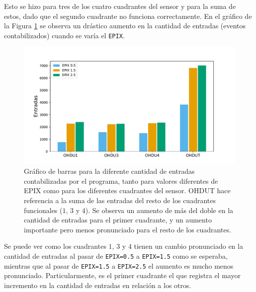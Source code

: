 Esto se hizo para tres de los cuatro cuadrantes del sensor y para la suma de estos, dado que el segundo cuadrante no funciona correctamente. En el gráfico de la Figura \ref{fig:EntradasVsEpix} se observa un drástico aumento en la cantidad de entradas (eventos contabilizados) cuando se varía el \verb|EPIX|.
\begin{figure}[h]
    \centering
    \includegraphics[scale=0.5]{Figs/Entradas_vs_Epix.pdf}
    \caption{Gráfico de barras para la diferente cantidad de entradas contabilizadas por el programa, tanto para valores diferentes de EPIX como para los diferentes cuadrantes del sensor. OHDUT hace referencia a la suma de las entradas del resto de los cuadrantes funcionales ($1$, $3$ y $4$). Se observa un aumento de más del doble en la cantidad de entradas para el primer cuadrante, y un aumento importante pero menos pronunciado para el resto de los cuadrantes.}
    \label{fig:EntradasVsEpix}
\end{figure}
Se puede ver como los cuadrantes $1$, $3$ y $4$ tienen un cambio pronunciado en la cantidad de entradas al pasar de \verb|EPIX=0.5| a \verb|EPIX=1.5| como se esperaba, mientras que al pasar de \verb|EPIX=1.5| a \verb|EPIX=2.5| el aumento es mucho menos pronunciado. 
Particularmente, es el primer cuadrante el que registra el mayor incremento en la cantidad de entradas en relación a los otros. 

